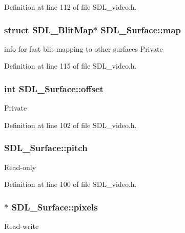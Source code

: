 Definition at line 112 of file S\+D\+L\+\_\+video.\+h.

\hypertarget{struct_s_d_l___surface_a8c1ecad399b0d4f525b1a53b6ee9393f}{}
\subsubsection[{map}]{\setlength{\rightskip}{0pt plus 5cm}struct S\+D\+L\+\_\+\+Blit\+Map$\ast$ S\+D\+L\+\_\+\+Surface\+::map}\label{struct_s_d_l___surface_a8c1ecad399b0d4f525b1a53b6ee9393f}
info for fast blit mapping to other surfaces Private 

Definition at line 115 of file S\+D\+L\+\_\+video.\+h.

\hypertarget{struct_s_d_l___surface_ab40c060fa976dbb25bebc7869132ffda}{}
\subsubsection[{offset}]{\setlength{\rightskip}{0pt plus 5cm}int S\+D\+L\+\_\+\+Surface\+::offset}\label{struct_s_d_l___surface_ab40c060fa976dbb25bebc7869132ffda}
Private 

Definition at line 102 of file S\+D\+L\+\_\+video.\+h.

\hypertarget{struct_s_d_l___surface_a53fd25784c0f6efd7dd19bb0afce5452}{}
\subsubsection[{pitch}]{ S\+D\+L\+\_\+\+Surface\+::pitch}\label{struct_s_d_l___surface_a53fd25784c0f6efd7dd19bb0afce5452}
Read-\/only 

Definition at line 100 of file S\+D\+L\+\_\+video.\+h.

\hypertarget{struct_s_d_l___surface_abd9597e0e084b8ef33fe0397bc26d911}{}
\subsubsection[{pixels}]{$\ast$ S\+D\+L\+\_\+\+Surface\+::pixels}\label{struct_s_d_l___surface_abd9597e0e084b8ef33fe0397bc26d911}
Read-\/write 

